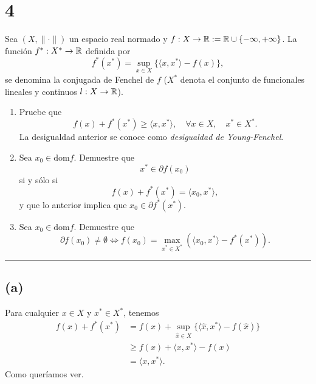 \section*{4}

Sea $(X, \| \cdot \|)$ un espacio real normado y $f : X \rightarrow \mathbb{R} := \mathbb{R} \cup \{-\infty, +\infty\}$.
La función $f^* : X^* \rightarrow \mathbb{R}$ definida por
\begin{equation*}
    f^* (x^*) = \sup_{x \in X} \{ \langle x, x^* \rangle - f(x) \},
\end{equation*}
se denomina la conjugada de Fenchel de $f$ ($X^*$ denota el conjunto de funcionales lineales y continuos $l : X \rightarrow \mathbb{R}$).

\begin{enumerate}[label=(\alph*)]
    \item Pruebe que
        \begin{equation*}
            f(x) + f^* (x^*) \geq \langle x, x^* \rangle, \quad \forall x \in X, \quad x^* \in X^*.
        \end{equation*}
        La desigualdad anterior se conoce como \textit{desigualdad de Young-Fenchel}.
    
    \item Sea $x_0 \in \text{dom} f$. Demuestre que
        \begin{equation*}
            x^* \in \partial f(x_0)
        \end{equation*}
        si y sólo si
        \begin{equation}\label{ex4_eq1}
            f(x) + f^*(x^*) = \langle x_0, x^* \rangle,
        \end{equation}
        y que lo anterior implica que $x_0 \in \partial f^*(x^*)$.
    
    \item Sea $x_0 \in \text{dom} f$. Demuestre que
        \begin{equation*}
            \partial f(x_0) \neq \emptyset 
                \iff f(x_0) = \max_{x^* \in X^*} (\langle x_0, x^* \rangle - f^*(x^*)).
        \end{equation*}
    
\end{enumerate}

\noindent\rule{10cm}{0.4pt}

\subsection*{(a)}

Para cualquier $x \in X$ y $x^* \in X^*$, tenemos
\begin{equation*}
\begin{aligned}
    f(x) + f^*(x^*)
        & = f(x) + \sup_{\hat{x} \in X} \{ \langle \hat{x}, x^* \rangle -f(\hat{x}) \} \\
        & \geq f(x) + \langle x, x^* \rangle - f(x) \\
        & = \langle x, x^* \rangle.
\end{aligned}
\end{equation*}
Como queríamos ver.


